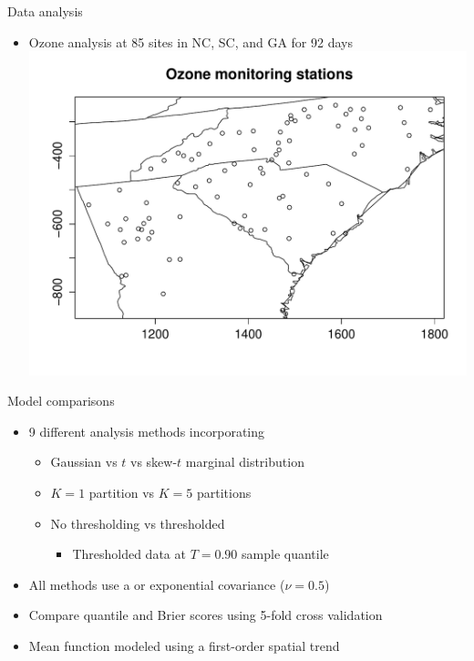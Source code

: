 \documentclass{beamer}
\begin{document}
\begin{frame}{Data analysis}
  \begin{itemize} \setlength{\itemsep}{0.5em}
    \item Ozone analysis at 85 sites in NC, SC, and GA for 92 days
    \includegraphics[width=1\linewidth]{./plots/ozone_station.pdf}
  \end{itemize}
\end{frame}

\begin{frame}{Model comparisons}
  \begin{itemize} \setlength{\itemsep}{0.5em}
    \item 9 different analysis methods incorporating
    \begin{itemize}
      \item Gaussian vs $t$ vs skew-$t$ marginal distribution
      \item $K=1$ partition vs $K=5$ partitions
      \item No thresholding vs thresholded
      \begin{itemize}
        \item Thresholded data at $T=0.90$ sample quantile
      \end{itemize}
    \end{itemize}
    \item All methods use a \Matern or exponential covariance ($\nu = 0.5$)
    \item Compare quantile and Brier scores using 5-fold cross validation
    \item Mean function modeled using a first-order spatial trend
  \end{itemize}
\end{frame}
\end{document}
